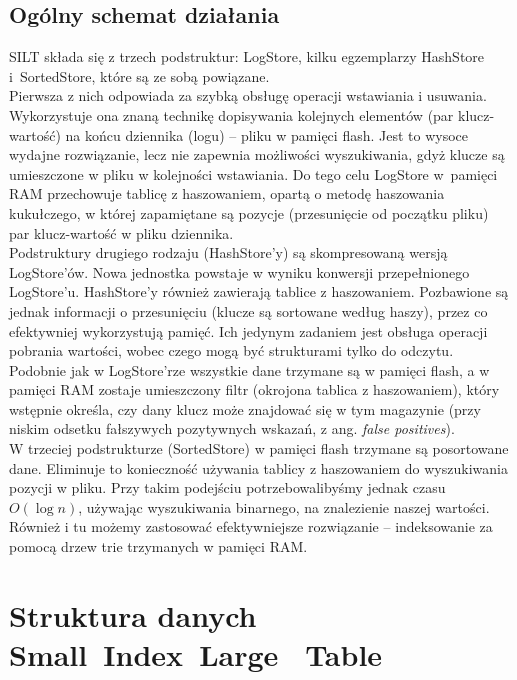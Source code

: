 \documentclass[declaration,shortabstract,masc]{iithesis}
\begin{document}
		\section{Ogólny schemat działania}
			SILT składa się z trzech podstruktur: LogStore, kilku egzemplarzy HashStore i~SortedStore, które są ze sobą powiązane.\\
			\indent Pierwsza z nich odpowiada za szybką obsługę operacji wstawiania i usuwania. Wykorzystuje ona znaną technikę dopisywania kolejnych elementów (par klucz-wartość) na końcu dziennika (logu) -- pliku w pamięci flash. Jest to wysoce wydajne rozwiązanie, lecz nie zapewnia możliwości wyszukiwania, gdyż klucze są umieszczone w pliku w kolejności wstawiania. Do tego celu LogStore w~pamięci RAM przechowuje tablicę z haszowaniem, opartą o metodę haszowania kukułczego, w której zapamiętane są pozycje (przesunięcie od początku pliku) par klucz-wartość w pliku dziennika.\\
			\indent Podstruktury drugiego rodzaju (HashStore'y) są skompresowaną wersją LogStore'ów. Nowa jednostka powstaje w wyniku konwersji przepełnionego LogStore'u. HashStore'y również zawierają tablice z haszowaniem. Pozbawione są jednak informacji o przesunięciu (klucze są sortowane według haszy), przez co efektywniej wykorzystują pamięć. Ich jedynym zadaniem jest obsługa operacji pobrania wartości, wobec czego mogą być strukturami tylko do odczytu. Podobnie jak w LogStore'rze wszystkie dane trzymane są w pamięci flash, a w pamięci RAM zostaje umieszczony filtr (okrojona tablica z haszowaniem), który wstępnie określa, czy dany klucz może znajdować się w tym magazynie (przy niskim odsetku fałszywych pozytywnych wskazań, z ang. \textit{false positives}).\\
			\indent W trzeciej podstrukturze (SortedStore) w pamięci flash trzymane są posortowane dane. Eliminuje to konieczność używania tablicy z haszowaniem do wyszukiwania pozycji w pliku. Przy takim podejściu potrzebowalibyśmy jednak czasu $O\left(\log n\right)$, używając wyszukiwania binarnego, na znalezienie naszej wartości. Również i tu możemy zastosować efektywniejsze rozwiązanie -- indeksowanie za pomocą drzew trie trzymanych w pamięci RAM.
	\chapter{Struktura danych Small~Index~Large~	Table}
		\label{logstore}
\end{document}
